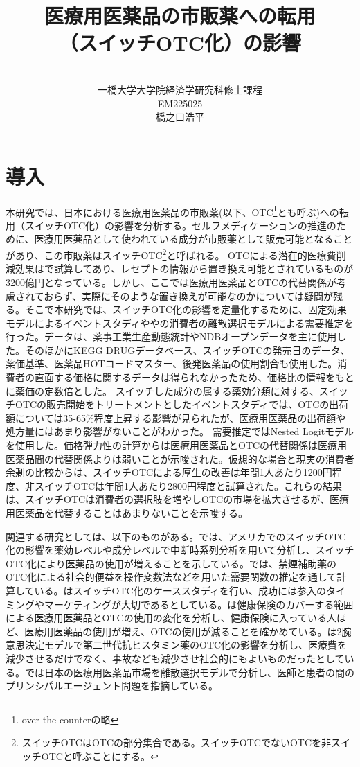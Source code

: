 \documentclass[a4paper,11pt,uplatex]{jsarticle}
\title{\huge 医療用医薬品の市販薬への転用\\（スイッチOTC化）の影響}
\author{\vspace{14cm}\\
一橋大学大学院経済学研究科修士課程\\
EM225025\\
橋之口浩平}
\date{}
\theoremstyle{definition}
\begin{document}
\thispagestyle{empty}
\maketitle{}
\setcounter{page}{1}
\section{導入}
本研究では、日本における医療用医薬品の市販薬(以下、OTC\footnote{over-the-counterの略}とも呼ぶ)への転用（スイッチOTC化）の影響を分析する。セルフメディケーションの推進のために、医療用医薬品として使われている成分が市販薬として販売可能となることがあり、この市販薬はスイッチOTC\footnote{スイッチOTCはOTCの部分集合である。スイッチOTCでないOTCを非スイッチOTCと呼ぶことにする。}と呼ばれる。
OTCによる潜在的医療費削減効果は\cite{igarashi2021}で試算してあり、レセプトの情報から置き換え可能とされているものが3200億円となっている。しかし、ここでは医療用医薬品とOTCの代替関係が考慮されておらず、実際にそのような置き換えが可能なのかについては疑問が残る。そこで本研究では、スイッチOTC化の影響を定量化するために、固定効果モデルによるイベントスタディや\cite{Berry1994}や\cite{BLP}の消費者の離散選択モデルによる需要推定を行った。データは、薬事工業生産動態統計やNDBオープンデータを主に使用した。そのほかにKEGG DRUGデータベース、スイッチOTCの発売日のデータ、薬価基準、医薬品HOTコードマスター、後発医薬品の使用割合も使用した。消費者の直面する価格に関するデータは得られなかったため、価格比の情報をもとに薬価の定数倍とした。
スイッチした成分の属する薬効分類に対する、スイッチOTCの販売開始をトリートメントとしたイベントスタディでは、OTCの出荷額については35-65\%程度上昇する影響が見られたが、医療用医薬品の出荷額や処方量にはあまり影響がないことがわかった。
需要推定ではNested Logitモデルを使用した。価格弾力性の計算からは医療用医薬品とOTCの代替関係は医療用医薬品間の代替関係よりは弱いことが示唆された。仮想的な場合と現実の消費者余剰の比較からは、スイッチOTCによる厚生の改善は年間1人あたり1200円程度、非スイッチOTCは年間1人あたり2800円程度と試算された。これらの結果は、スイッチOTCは消費者の選択肢を増やしOTCの市場を拡大させるが、医療用医薬品を代替することはあまりないことを示唆する。

関連する研究としては、以下のものがある。\cite{Stomberg2013}では、アメリカでのスイッチOTC化の影響を薬効レベルや成分レベルで中断時系列分析を用いて分析し、スイッチOTC化により医薬品の使用が増えることを示している。\cite{Keeler2002}では、禁煙補助薬のOTC化による社会的便益を操作変数法などを用いた需要関数の推定を通して計算している。\cite{Mahecha2006}はスイッチOTC化のケーススタディを行い、成功には参入のタイミングやマーケティングが大切であるとしている。\cite{medicare1995}は健康保険のカバーする範囲による医療用医薬品とOTCの使用の変化を分析し、健康保険に入っている人ほど、医療用医薬品の使用が増え、OTCの使用が減ることを確かめている。\cite{medicare2003}は2腕意思決定モデルで第二世代抗ヒスタミン薬のOTC化の影響を分析し、医療費を減少させるだけでなく、事故なども減少させ社会的にもよいものだったとしている。\cite{Iizuka2007}では日本の医療用医薬品市場を離散選択モデルで分析し、医師と患者の間のプリンシパルエージェント問題を指摘している。
\end{document}
